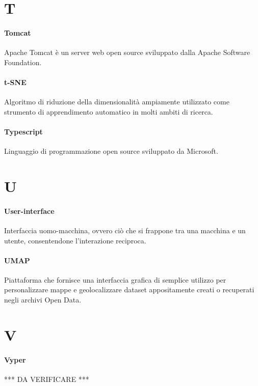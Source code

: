 \documentclass[]{article}
\begin{document}
	\section*{T}
	
	\paragraph*{Tomcat}
	Apache Tomcat è un server web open source sviluppato dalla Apache Software Foundation.
	
	\paragraph*{t-SNE}
	Algoritmo di riduzione della dimensionalità ampiamente utilizzato come strumento di apprendimento automatico in molti ambiti di ricerca.
	
	\paragraph*{Typescript}
	Linguaggio di programmazione open source sviluppato da Microsoft.
	
	\newpage
	
	\section*{U}
	
	\paragraph*{User-interface}
	Interfaccia uomo-macchina, ovvero ciò che si frappone tra una macchina e un utente, consentendone l'interazione reciproca.
	
	\paragraph*{UMAP}
	Piattaforma che fornisce una interfaccia grafica di semplice utilizzo per personalizzare mappe e geolocalizzare dataset appositamente creati o recuperati negli archivi Open Data.
	
	\newpage
	
	\section*{V}
	
	\paragraph*{Vyper}
	*** DA VERIFICARE ***
	
\end{document}
